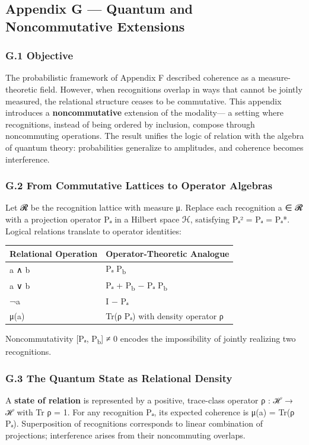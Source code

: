 \documentclass[11pt]{article}
\begin{document}
\subsection*{Appendix G — Quantum and Noncommutative Extensions}
\label{sec:org3a1d75f}

\subsubsection*{G.1 Objective}
\label{sec:orge17acbd}
The probabilistic framework of Appendix F described coherence as a measure-theoretic field.  
However, when recognitions overlap in ways that cannot be jointly measured,  
the relational structure ceases to be commutative.  
This appendix introduces a \textbf{noncommutative} extension of the modality—  
a setting where recognitions, instead of being ordered by inclusion,  
compose through noncommuting operations.  
The result unifies the logic of relation with the algebra of quantum theory:  
probabilities generalize to amplitudes, and coherence becomes interference.
\subsubsection*{G.2 From Commutative Lattices to Operator Algebras}
\label{sec:org0234c50}
Let 𝓡 be the recognition lattice with measure μ.  
Replace each recognition a ∈ 𝓡 with a projection operator Pₐ  
in a Hilbert space ℋ, satisfying Pₐ² = Pₐ = Pₐ*.  
Logical relations translate to operator identities:

\begin{center}
\begin{tabular}{ll}
Relational Operation & Operator-Theoretic Analogue\\
\hline
a ∧ b & Pₐ P\textsubscript{b}\\
a ∨ b & Pₐ + P\textsubscript{b} − Pₐ P\textsubscript{b}\\
¬a & I − Pₐ\\
μ(a) & Tr(ρ Pₐ) with density operator ρ\\
\end{tabular}
\end{center}

Noncommutativity [Pₐ, P\textsubscript{b}] ≠ 0 encodes the impossibility of jointly realizing two recognitions.
\subsubsection*{G.3 The Quantum State as Relational Density}
\label{sec:orgf4968c3}
A \textbf{state of relation} is represented by a positive, trace-class operator  
ρ : ℋ → ℋ with Tr ρ = 1.  
For any recognition Pₐ, its expected coherence is  
μ(a) = Tr(ρ Pₐ).  
Superposition of recognitions corresponds to linear combination of projections;  
interference arises from their noncommuting overlaps.
\end{document}
